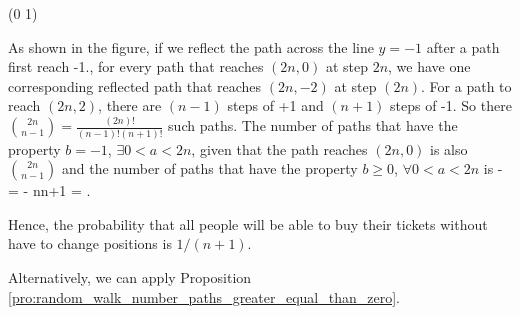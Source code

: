 \begin{solution}[\bf Solution.]
{\move (0 1)

}

As shown in the figure, if we reflect the path across the line $y=-1$ after a path first reach -1., for every path that reaches $(2n,0)$ at step $2n$, we have one corresponding reflected path that
reaches $(2n,-2)$ at step $(2n)$. For a path to reach $(2n,2)$, there are $(n-1)$ steps of +1 and $(n+1)$ steps of -1. So there $\binom{2n}{n-1} = \frac{(2n)!}{(n-1)!(n+1)!}$ such paths. The number
of paths that have the property $b=-1$, $\exists 0<a<2n$, given that the path reaches $(2n,0)$ is also $\binom{2n}{n-1}$ and the number of paths that have the property $b\geq 0$, $\forall 0<a<2n$ is
\be
{} -  =  - \frac n{n+1} = .
\ee

Hence, the probability that all people will be able to buy their tickets without have to change positions is $1/(n+1)$.

Alternatively, we can apply Proposition \ref{pro:random_walk_number_paths_greater_equal_than_zero}.
\end{solution}
